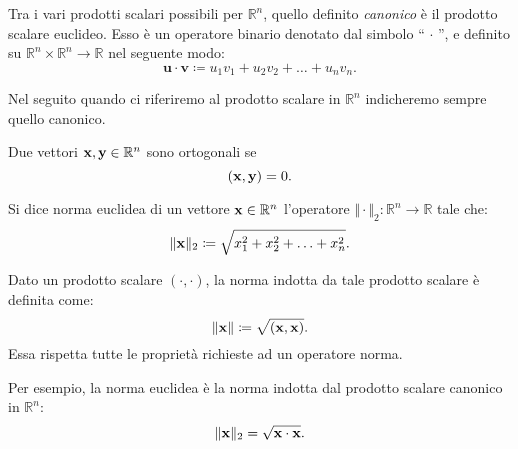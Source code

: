 \begin{definition}
 Tra i vari prodotti scalari possibili per $\mathbb{R}^{n}$, quello definito \textit{canonico} è il prodotto scalare euclideo.
Esso è un operatore binario denotato dal simbolo ``$\, \cdot \,$'', e definito su $\mathbb{R}^{n} \times \mathbb{R}^{n}\rightarrow \mathbb{R}$ nel seguente modo:
\begin{equation*}
\mathbf{u} \cdot \mathbf{v} \coloneqq u_{1} v_{1} +u_{2} v_{2} +\dotsc +u_{n} v_{n}.
\end{equation*}
\end{definition}
Nel seguito quando ci riferiremo al prodotto scalare in $\mathbb{R}^{n}$ indicheremo sempre quello canonico.
\begin{definition}
	[Ortogonalità]
	Due vettori $\mathbf{x} ,\mathbf{y} \in \mathbb{R}^{n}$ sono ortogonali se
	$$(\mathbf{x} ,\mathbf{y}) =0.$$
\end{definition}
\begin{definition}
	Si dice norma euclidea di un vettore $\mathbf{x} \in \mathbb{R}^{n}$ l'operatore $\Vert \cdot \Vert_{2}  :\mathbb{R}^{n}\rightarrow \mathbb{R}$ tale che:
	\begin{equation*}
		\Vert \mathbf{x}\Vert_{2} \coloneqq \sqrt{x^{2}_{1} +x^{2}_{2} +\dotsc +x^{2}_{n}}.
	\end{equation*}
	\label{def:norma-euclidea}
\end{definition}
\begin{definition}
	Dato un prodotto scalare $( \cdot ,\cdot )$, la norma indotta da tale prodotto scalare è definita come:
	\begin{equation*}
		\Vert \mathbf{x}\Vert \coloneqq \sqrt{(\mathbf{x} ,\mathbf{x})}.
	\end{equation*}
  Essa rispetta tutte le proprietà richieste ad un operatore norma.
\end{definition}
Per esempio, la norma euclidea è la norma indotta dal prodotto scalare canonico in $\mathbb{R}^{n}$:
\begin{equation*}
  \Vert \mathbf{x}\Vert_{2} =\sqrt{\mathbf{x} \cdot \mathbf{x}}.
\end{equation*}

